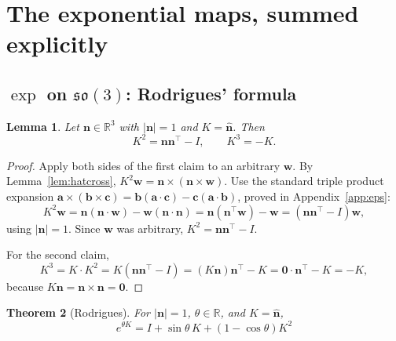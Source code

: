 \documentclass[11pt]{article}
\newcommand{\so}{\mathfrak{so}}
\newcommand{\R}{\mathbb{R}}
\newcommand{\vv}[1]{\bm{#1}}
\newcommand{\hatmap}[1]{\widehat{#1}}
\theoremstyle{plain}
\newtheorem{theorem}{Theorem}[section]
\newtheorem{lemma}[theorem]{Lemma}
\theoremstyle{definition}
\begin{document}
\section{The exponential maps, summed explicitly}

\subsection{$\exp$ on $\so(3)$: Rodrigues' formula}

\begin{lemma}\label{lem:Kcubed}
Let $\vv n\in\R^3$ with $|\vv n|=1$ and $K=\hatmap{\vv n}$. Then
\[
K^2=\vv n\vv n^{\!\top}-I,\qquad K^3=-K .
\]
\end{lemma}

\begin{proof}
Apply both sides of the first claim to an arbitrary $\vv w$. By Lemma~\ref{lem:hatcross},
$K^2\vv w=\vv n\times(\vv n\times\vv w)$. Use the standard triple product expansion
$\vv a\times(\vv b\times\vv c)=\vv b(\vv a\cdot\vv c)-\vv c(\vv a\cdot\vv b)$, proved in
Appendix~\ref{app:eps}:
\[
K^2\vv w=\vv n(\vv n\cdot\vv w)-\vv w(\vv n\cdot\vv n)=\vv n(\vv n^{\!\top}\vv w)-\vv w
=(\vv n\vv n^{\!\top}-I)\vv w ,
\]
using $|\vv n|=1$. Since $\vv w$ was arbitrary, $K^2=\vv n\vv n^{\!\top}-I$.

For the second claim,
\[
K^3=K\cdot K^2=K(\vv n\vv n^{\!\top}-I)=(K\vv n)\vv n^{\!\top}-K = \vv 0\cdot\vv n^{\!\top}-K=-K ,
\]
because $K\vv n=\vv n\times\vv n=\vv 0$.
\end{proof}

\begin{theorem}[Rodrigues]\label{thm:rodrigues}
For $|\vv n|=1$, $\theta\in\R$, and $K=\hatmap{\vv n}$,
\[
\boxed{\ e^{\theta K}=I+\sin\theta\,K+(1-\cos\theta)K^2\ }
\]
\end{theorem}
\end{document}
